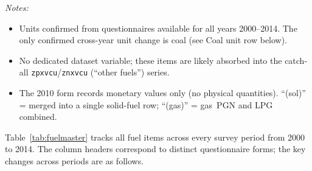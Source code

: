 \documentclass[11pt, a4paper]{article}
\begin{document}
\begin{table}[H]
\noindent\small\textit{Notes:}
\begin{itemize}[noitemsep, leftmargin=1.2em, topsep=2pt]
  \item Units confirmed from questionnaires available for all years 2000--2014.
        The only confirmed cross-year unit change is coal (see Coal unit row below).
  \item[$^\dagger$] No dedicated dataset variable; these items are likely absorbed into the
        catch-all \texttt{zpxvcu}/\texttt{znxvcu} (``other fuels'') series.
  \item[$^b$] The 2010 form records monetary values only (no physical quantities).
        ``(sol)'' = merged into a single solid-fuel row;
        ``(gas)'' = gas~PGN and LPG combined.
\end{itemize}
\end{table}

Table~\ref{tab:fuelmaster} tracks all fuel items across every survey period from 2000 to 2014.
The column headers correspond to distinct questionnaire forms; the key changes across periods are
as follows.
\end{document}
